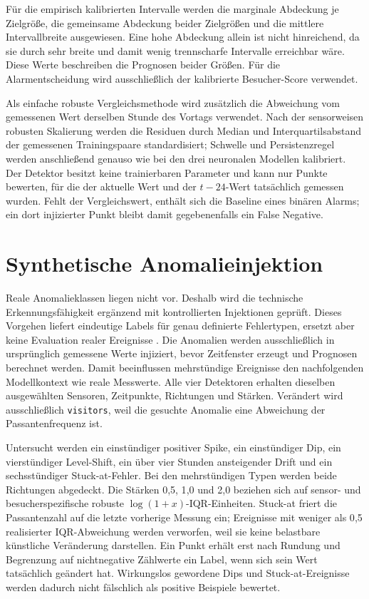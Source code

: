 Für die empirisch kalibrierten Intervalle werden die marginale Abdeckung je
Zielgröße, die gemeinsame Abdeckung beider Zielgrößen und die mittlere
Intervallbreite ausgewiesen. Eine hohe Abdeckung allein ist nicht hinreichend,
da sie durch sehr breite und damit wenig trennscharfe Intervalle erreichbar
wäre. Diese Werte beschreiben die Prognosen beider Größen. Für die
Alarmentscheidung wird ausschließlich der kalibrierte Besucher-Score verwendet.

Als einfache robuste Vergleichsmethode wird zusätzlich die Abweichung vom
gemessenen Wert derselben Stunde des Vortags verwendet. Nach der sensorweisen
robusten Skalierung werden die Residuen durch Median und Interquartilsabstand
der gemessenen Trainingspaare standardisiert;
Schwelle und Persistenzregel werden anschließend genauso wie bei den drei
neuronalen Modellen kalibriert. Der Detektor besitzt keine trainierbaren
Parameter und kann nur Punkte bewerten, für die der aktuelle Wert und der
$t-24$-Wert tatsächlich gemessen wurden. Fehlt der Vergleichswert, enthält
sich die Baseline eines binären Alarms; ein dort injizierter Punkt bleibt
damit gegebenenfalls ein False Negative.

\section[Anomalieinjektion]{Synthetische Anomalieinjektion}

Reale Anomalieklassen liegen nicht vor. Deshalb wird die technische
Erkennungsfähigkeit ergänzend mit kontrollierten Injektionen geprüft. Dieses
Vorgehen liefert eindeutige Labels für genau definierte Fehlertypen, ersetzt
aber keine Evaluation realer Ereignisse \cite{schmidl2022evaluation}. Die
Anomalien werden ausschließlich in ursprünglich gemessene Werte injiziert,
bevor Zeitfenster erzeugt und Prognosen berechnet werden. Damit beeinflussen
mehrstündige Ereignisse den nachfolgenden Modellkontext wie reale Messwerte.
Alle vier Detektoren erhalten dieselben ausgewählten Sensoren, Zeitpunkte,
Richtungen und Stärken. Verändert wird ausschließlich
\texttt{visitors}, weil die gesuchte Anomalie eine Abweichung der
Passantenfrequenz ist.

Untersucht werden ein einstündiger positiver Spike, ein einstündiger Dip, ein
vierstündiger Level-Shift, ein über vier Stunden ansteigender Drift und ein
sechsstündiger Stuck-at-Fehler. Bei den mehrstündigen Typen werden beide
Richtungen abgedeckt. Die
Stärken 0{,}5, 1{,}0 und 2{,}0 beziehen sich auf sensor- und
besucherspezifische robuste $\log(1+x)$-IQR-Einheiten. Stuck-at friert die
Passantenzahl auf die letzte vorherige Messung ein; Ereignisse mit weniger als
0{,}5 realisierter IQR-Abweichung werden verworfen, weil sie keine belastbare
künstliche Veränderung darstellen. Ein Punkt erhält erst nach Rundung und
Begrenzung auf nichtnegative Zählwerte ein Label, wenn sich sein Wert
tatsächlich geändert hat. Wirkungslos gewordene Dips und Stuck-at-Ereignisse
werden dadurch nicht fälschlich als positive Beispiele bewertet.

